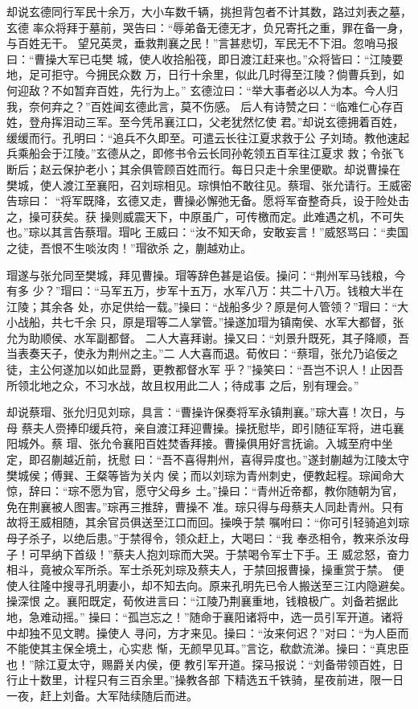 却说玄德同行军民十余万，大小车数千辆，挑担背包者不计其数，路过刘表之墓，玄德
率众将拜于墓前，哭告曰：“辱弟备无德无才，负兄寄托之重，罪在备一身，与百姓无干。
望兄英灵，垂救荆襄之民！”言甚悲切，军民无不下泪。忽哨马报曰：“曹操大军已屯樊
城，使人收拾船筏，即日渡江赶来也。”众将皆曰：“江陵要地，足可拒守。今拥民众数
万，日行十余里，似此几时得至江陵？倘曹兵到，如何迎敌？不如暂弃百姓，先行为上。”
玄德泣曰：“举大事者必以人为本。今人归我，奈何弃之？”百姓闻玄德此言，莫不伤感。
后人有诗赞之曰：“临难仁心存百姓，登舟挥泪动三军。至今凭吊襄江口，父老犹然忆使
君。”却说玄德拥着百姓，缓缓而行。孔明曰：“追兵不久即至。可遣云长往江夏求救于公
子刘琦。教他速起兵乘船会于江陵。”玄德从之，即修书令云长同孙乾领五百军往江夏求
救；令张飞断后；赵云保护老小；其余俱管顾百姓而行。每日只走十余里便歇。却说曹操在
樊城，使人渡江至襄阳，召刘琮相见。琮惧怕不敢往见。蔡瑁、张允请行。王威密告琮曰：
“将军既降，玄德又走，曹操必懈弛无备。愿将军奋整奇兵，设于险处击之，操可获矣。获
操则威震天下，中原虽广，可传檄而定。此难遇之机，不可失也。”琮以其言告蔡瑁。瑁叱
王威曰：“汝不知天命，安敢妄言！”威怒骂曰：“卖国之徒，吾恨不生啖汝肉！”瑁欲杀
之，蒯越劝止。

瑁遂与张允同至樊城，拜见曹操。瑁等辞色甚是谄佞。操问：“荆州军马钱粮，今有多
少？”瑁曰：“马军五万，步军十五万，水军八万：共二十八万。钱粮大半在江陵；其余各
处，亦足供给一载。”操曰：“战船多少？原是何人管领？”瑁曰：“大小战船，共七千余
只，原是瑁等二人掌管。”操遂加瑁为镇南侯、水军大都督，张允为助顺侯、水军副都督。
二人大喜拜谢。操又曰：“刘景升既死，其子降顺，吾当表奏天子，使永为荆州之主。”二
人大喜而退。荀攸曰：“蔡瑁，张允乃谄佞之徒，主公何遂加以如此显爵，更教都督水军
乎？”操笑曰：“吾岂不识人！止因吾所领北地之众，不习水战，故且权用此二人；待成事
之后，别有理会。”

却说蔡瑁、张允归见刘琮，具言：“曹操许保奏将军永镇荆襄。”琮大喜！次日，与母
蔡夫人赍捧印缓兵符，亲自渡江拜迎曹操。操抚慰毕，即引随征军将，进屯襄阳城外。蔡
瑁、张允令襄阳百姓焚香拜接。曹操俱用好言抚谕。入城至府中坐定，即召蒯越近前，抚慰
曰：“吾不喜得荆州，喜得异度也。”遂封蒯越为江陵太守樊城侯；傅巽、王粲等皆为关内
侯；而以刘琮为青州刺史，便教起程。琮闻命大惊，辞曰：“琮不愿为官，愿守父母乡
土。”操曰：“青州近帝都，教你随朝为官，免在荆襄被人图害。”琮再三推辞，曹操不
准。琮只得与母蔡夫人同赴青州。只有故将王威相随，其余官员俱送至江口而回。操唤于禁
嘱咐曰：“你可引轻骑追刘琮母子杀子，以绝后患。”于禁得令，领众赶上，大喝曰：“我
奉丞相令，教来杀汝母子！可早纳下首级！”蔡夫人抱刘琮而大哭。于禁喝令军士下手。王
威忿怒，奋力相斗，竟被众军所杀。军士杀死刘琮及蔡夫人，于禁回报曹操，操重赏于禁。
便使人往隆中搜寻孔明妻小，却不知去向。原来孔明先已令人搬送至三江内隐避矣。操深恨
之。襄阳既定，荀攸进言曰：“江陵乃荆襄重地，钱粮极广。刘备若据此地，急难动摇。”
操曰：“孤岂忘之！”随命于襄阳诸将中，选一员引军开道。诸将中却独不见文聘。操使人
寻问，方才来见。操曰：“汝来何迟？”对曰：“为人臣而不能使其主保全境土，心实悲
惭，无颜早见耳。”言讫，欷歔流涕。操曰：“真忠臣也！”除江夏太守，赐爵关内侯，便
教引军开道。探马报说：“刘备带领百姓，日行止十数里，计程只有三百余里。”操教各部
下精选五千铁骑，星夜前进，限一日一夜，赶上刘备。大军陆续随后而进。

